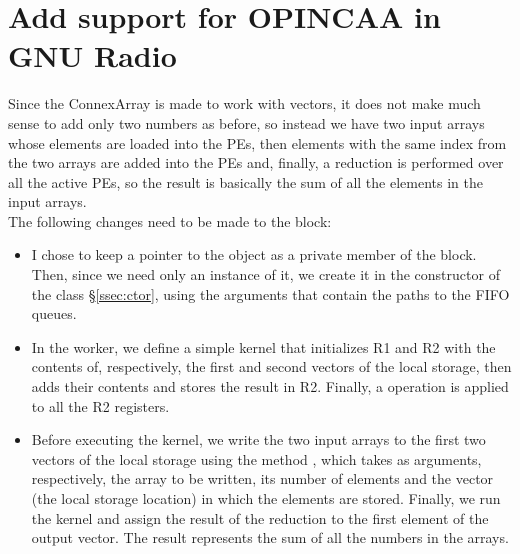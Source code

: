 
\section{Add support for OPINCAA in GNU Radio}
\label{sec:opincaa}

Since the ConnexArray is made to work with vectors, it does not make much sense
to add only two numbers as before, so instead we have two input arrays whose
elements are loaded into the PEs, then elements with the same index from the two
arrays are added into the PEs and, finally, a reduction is performed over all
the active PEs, so the result is basically the sum of all the elements in the
input arrays.\\

The following changes need to be made to the block:
\begin{itemize}
  \item I chose to keep a pointer to the  object as a
          private member of the  block. Then, since we need only an
          instance of it, we create it in the constructor of the class
          \S\ref{ssec:ctor}, using the arguments that contain the paths to the FIFO queues.
          
  \item In the worker, we define a simple  kernel that initializes R1
          and R2 with the contents of, respectively, the first and second vectors of
          the local storage, then adds their contents and stores the result in R2.
          Finally, a  operation is applied to all the R2 registers.

  \item Before executing the kernel, we write the two input arrays to the first two
          vectors of the local storage using the method
          , which takes as arguments, respectively, the
          array to be written, its number of elements and the vector (the local
          storage location) in which the elements are stored.
          Finally, we run the kernel and assign the result of the reduction to the
          first element of the output vector. The result represents the sum of
          all the numbers in the arrays.
\end{itemize}

